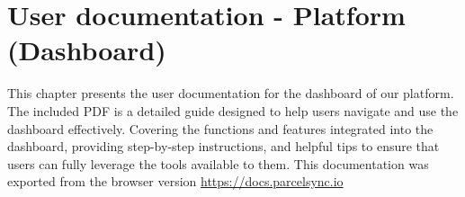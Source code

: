 \chapter{User documentation - Platform (Dashboard)}
This chapter presents the user documentation for the dashboard of our platform. 
The included PDF is a detailed guide designed to help users navigate and use the dashboard effectively. 
Covering the functions and features integrated into the dashboard, providing step-by-step instructions, and helpful tips to ensure that users can fully leverage the tools available to them. 
This documentation was exported from the browser version \url{https://docs.parcelsync.io}
